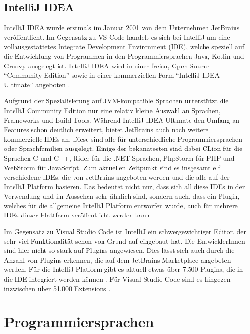 \subsection{IntelliJ IDEA}

IntelliJ IDEA wurde erstmals im Januar 2001 \cite{IntelliJReleasePage}
von dem Unternehmen 
JetBrains veröffentlicht. Im Gegensatz zu VS Code handelt 
es sich bei IntelliJ um eine vollausgestattetes Integrate Development Environment (IDE),
welche speziell auf die Entwicklung 
von Programmen in den Programmiersprachen Java, Kotlin und Groovy ausgelegt ist. 
IntelliJ IDEA wird in einer freien, Open Source 
\enquote{Community Edition} \cite{IntelliJCommunityEditionGithub} sowie in einer kommerziellen Form 
\enquote{IntelliJ IDEA Ultimate} angeboten \cite{HagosTed2022BII:}. 

Aufgrund der Spezialisierung auf JVM-kompatible Sprachen unterstützt 
die IntelliJ Community Edition nur eine relativ kleine Auswahl an 
Sprachen, Frameworks und Build Tools. Während IntelliJ IDEA Ultimate 
den Umfang an Features schon deutlich erweitert, bietet JetBrains auch 
noch weitere kommerzielle IDEs an. Diese sind alle für unterschiedliche 
Programmiersprachen oder Sprachfamilien ausgelegt. Einige der bekanntesten 
sind dabei CLion für die Sprachen C und C++, Rider für die .NET Sprachen, 
PhpStorm für PHP und WebStorm für JavaScript. Zum aktuellen 
Zeitpunkt sind es insgesamt elf verschiedene IDEs, die von JetBrains 
angeboten werden und die alle auf der IntelliJ Platform basieren. Das 
bedeutet nicht nur, dass sich all diese IDEs in der Verwendung und im 
Aussehen sehr ähnlich sind, sondern auch, dass ein Plugin, welches für 
die allgemeine IntelliJ Platform entworfen wurde, 
auch für mehrere IDEs dieser Plattform veröffentlicht werden kann \cite{IntelliJSDKDocumentation}.

Im Gegensatz zu Visual Studio Code ist IntelliJ ein schwergewichtiger
Editor, der sehr viel Funktionalität schon von Grund auf eingebaut 
hat. Die EntwicklerInnen sind hier nicht so stark auf Plugins angewiesen.
Dies lässt sich auch durch die Anzahl von Plugins erkennen, die auf dem 
JetBrains Marketplace angeboten werden. Für die IntelliJ Platform gibt 
es aktuell etwas über 7.500 Plugins, die in die IDE integriert werden können 
\cite{IntelliJMarketplace}.
Für Visual Studio Code sind es hingegen inzwischen über 51.000 Extensions
\cite{VSCodeMarketplace}.


\section{Programmiersprachen}
\label{sec:Programmiersprachen}


